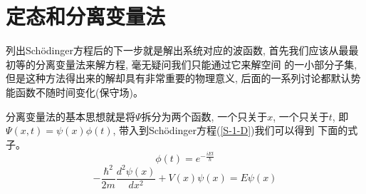 \documentclass[a4paper,zihao=-4,linespread=1]{ctexrep}
\newenvironment{lequation}{\large\begin{equation}}{\end{equation}}
\begin{document}
    \section{定态和分离变量法}
    列出Sch\"{o}dinger方程后的下一步就是解出系统对应的波函数, 首先我们应该从最最初等的分离变量法来解方程, 毫无疑问我们只能通过它来解空间
    的一小部分子集, 但是这种方法得出来的解却具有非常重要的物理意义, 后面的一系列讨论都默认势能函数不随时间变化(保守场)。

    分离变量法的基本思想就是将$\Psi$拆分为两个函数, 一个只关于$x$, 一个只关于$t$, 即$\Psi(x,t)=\psi(x)\phi(t)$, 带入到Sch\"{o}dinger方程(\ref{S-1-D})我们可以得到
    下面的式子。
    \begin{lequation}
        \label{wiggle-function}
        \boxed{
            \phi(t)=e^{-\frac{iEt}{\hbar}}
        }
    \end{lequation}
    \begin{lequation}
        \label{time-independent-equation}
        \boxed{
            -\frac{\hbar^2}{2m}\frac{d^2\psi(x)}{dx^2}+V(x)\psi(x)=E\psi(x)
        }
    \end{lequation}
\end{document}
